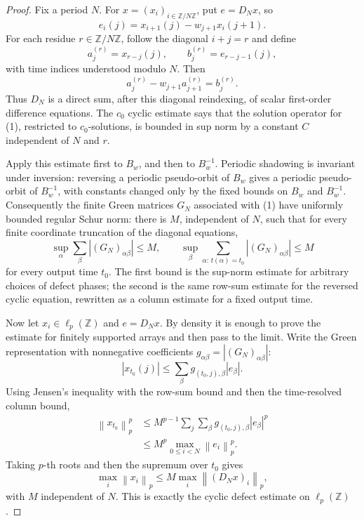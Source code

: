 \documentclass[11pt]{amsart}
\theoremstyle{remark}
\newcommand{\Z}{\mathbb Z}
\newcommand{\norm}[1]{\left\|#1\right\|}
\newcommand{\abs}[1]{\left|#1\right|}
\begin{document}
\begin{proof}
Fix a period \(N\).  For \(x=(x_i)_{i\in\Z/N\Z}\), put \(e=D_Nx\), so
\[
 e_i(j)=x_{i+1}(j)-w_{j+1}x_i(j+1).
\]
For each residue \(r\in\Z/N\Z\), follow the diagonal \(i+j=r\) and define
\[
 a^{(r)}_j=x_{r-j}(j),\qquad b^{(r)}_j=e_{r-j-1}(j),
\]
with time indices understood modulo \(N\).  Then
\[
 a^{(r)}_j-w_{j+1}a^{(r)}_{j+1}=b^{(r)}_j. \tag{1}
\]
Thus \(D_N\) is a direct sum, after this diagonal reindexing, of scalar first-order difference equations.  The \(c_0\) cyclic estimate says that the solution operator for (1), restricted to \(c_0\)-solutions, is bounded in sup norm by a constant \(C\) independent of \(N\) and \(r\).

Apply this estimate first to \(B_w\), and then to \(B_w^{-1}\).  Periodic shadowing is invariant under inversion: reversing a periodic pseudo-orbit of \(B_w\) gives a periodic pseudo-orbit of \(B_w^{-1}\), with constants changed only by the fixed bounds on \(B_w\) and \(B_w^{-1}\).  Consequently the finite Green matrices \(G_N\) associated with (1) have uniformly bounded regular Schur norm: there is \(M\), independent of \(N\), such that for every finite coordinate truncation of the diagonal equations,
\[
 \sup_{\alpha}\sum_{\beta}\abs{(G_N)_{\alpha\beta}}\leq M,
 \qquad
 \sup_{\beta}\sum_{\alpha:\, t(\alpha)=t_0}\abs{(G_N)_{\alpha\beta}}\leq M
\]
for every output time \(t_0\).  The first bound is the sup-norm estimate for arbitrary choices of defect phases; the second is the same row-sum estimate for the reversed cyclic equation, rewritten as a column estimate for a fixed output time.

Now let \(x_i\in\ell_p(\Z)\) and \(e=D_Nx\).  By density it is enough to prove the estimate for finitely supported arrays and then pass to the limit.  Write the Green representation with nonnegative coefficients \(g_{\alpha\beta}=\abs{(G_N)_{\alpha\beta}}\):
\[
 \abs{x_{t_0}(j)}\leq \sum_{\beta} g_{(t_0,j),\beta}\abs{e_\beta}.
\]
Using Jensen's inequality with the row-sum bound and then the time-resolved column bound,
\[
\begin{aligned}
 \norm{x_{t_0}}_p^p
 &\leq M^{p-1}\sum_j\sum_{\beta}g_{(t_0,j),\beta}\abs{e_\beta}^p\\
 &\leq M^p \max_{0\leq i<N}\norm{e_i}_p^p .
\end{aligned}
\]
Taking \(p\)-th roots and then the supremum over \(t_0\) gives
\[
 \max_i\norm{x_i}_p\leq M\max_i\norm{(D_Nx)_i}_p,
\]
with \(M\) independent of \(N\).  This is exactly the cyclic defect estimate on \(\ell_p(\Z)\).
\end{proof}
\end{document}
